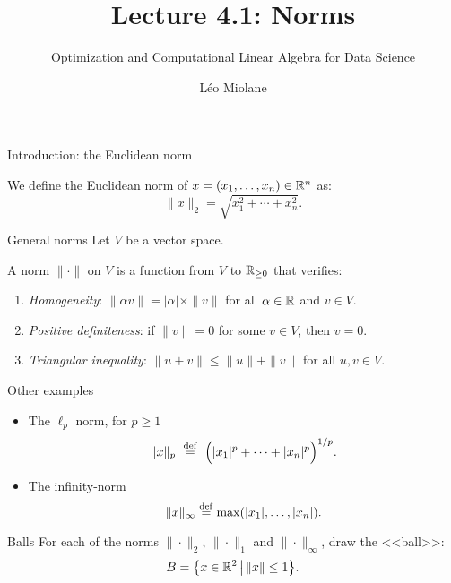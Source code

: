 \documentclass{beamer}
\title{Lecture 4.1: Norms}
\subtitle{Optimization and Computational Linear Algebra for Data Science}
\author{Léo Miolane}
\date{}
\begin{document}
\setcounter{showProgressBar}{0}
\setcounter{showSlideNumbers}{0}

\frame{\titlepage}

\setcounter{framenumber}{0}
\setcounter{showSlideNumbers}{1}

\begin{frame}[t]{Introduction: the Euclidean norm}
	\vspace{-0.4cm}
	\begin{definition}
		We define the Euclidean norm of $x=(x_1, \dots, x_n) \in \mathbb{R}^n$ as:
		$$
		\| x\|_2 = \sqrt{x_1^2 + \cdots + x_n^2}.
		$$
	\end{definition}
	\pause


\end{frame}

\begin{frame}[t]{General norms}
	Let $V$ be a vector space.
	\begin{definition}
		A norm $\| \cdot \|$ on $V$ is a function from $V$ to $\mathbb{R}_{\geq 0}$ that verifies:
		\vspace{0.1cm}
		\begin{enumerate}
			\item \emph{Homogeneity}: $\| \alpha v \| = |\alpha|\times \| v\|$ for all $\alpha \in \mathbb{R}$ and  $v \in V$.
				\vspace{0.1cm}
			\item \emph{Positive definiteness}: if $\|v\| = 0$ for some $v \in V$, then $v=0$.
				\vspace{0.1cm}
			\item \emph{Triangular inequality}: $\|u + v\| \leq \|u\| + \|v\|$ for all $u,v \in V$.
		\end{enumerate}
	\end{definition}
\end{frame}


\begin{frame}[t]{Other examples}
	\begin{itemize}
		\item The $\ell_p$ norm, for $p \geq 1$
			$$\|x\|_p \ \overset{\rm def}{=} \ \Big( |x_1|^p + \cdots + |x_n|^p \Big)^{1/p}.$$
		\item The infinity-norm 
			$$\|x \|_{\infty} \overset{\rm def}{=} \max(|x_1|, \dots, |x_n|).$$
	\end{itemize}
\end{frame}
\begin{frame}[t]{Balls}
	\vspace{-0.2cm}
	For each of the norms $\| \cdot \|_2$, $\| \cdot \|_1$ and $\| \cdot \|_{\infty}$, draw the <<ball>>:
	$$
	B = \big\{ x \in \mathbb{R}^2 \, \big| \, \|x\| \leq 1 \big\}.
	$$
	\pause
	\pause
\end{frame}
\end{document}
